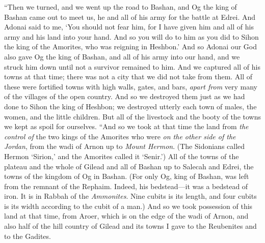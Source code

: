 \begin{biblechapter} %
\verse “Then we turned, and we went up the road to Bashan, and Og the king of Bashan came out to meet us, he and all of his army for the battle at Edrei.
\verse And Adonai said to me, ‘You should not fear him, for I have given him and all of his army and his land into your hand. And so you will do to him as you did to Sihon the king of the Amorites, who was reigning in Heshbon.’
\verse And so Adonai our God also gave Og the king of Bashan, and all of his army into our hand, and we struck him down until not a survivor remained to him.
\verse And we captured all of his towns at that time; there was not a city that we did not take from them.
\verse All of these were fortified towns with high walls, gates, and bars, \textit{apart from} very many of the villages of the open country.
\verse And so we destroyed them just as we had done to Sihon the king of Heshbon; we destroyed utterly each town of males, the women, and the little children.
\verse But all of the livestock and the booty of the towns we kept as spoil for ourselves.
\verse “And so we took at that time the land from \textit{the control of} the two kings of the Amorites who were \textit{on the other side of the Jordan}, from the wadi of Arnon up to \textit{Mount Hermon}.
\verse (The Sidonians called Hermon ‘Sirion,’ and the Amorites called it ‘Senir.’)
\verse All of the towns of the plateau and the whole of Gilead and all of Bashan up to Salecah and Edrei, the towns of the kingdom of Og in Bashan.
\verse (For only Og, king of Bashan, was left from the remnant of the Rephaim. Indeed, his bedstead—it was a bedstead of iron. It is in Rabbah of the \textit{Ammonites}. Nine cubits is its length, and four cubits is its width according to the cubit of a man.)
\verse And so we took possession of this land at that time, from Aroer, which is on the edge of the wadi of Arnon, and also half of the hill country of Gilead and its towns I gave to the Reubenites and to the Gadites.

\end{biblechapter}
